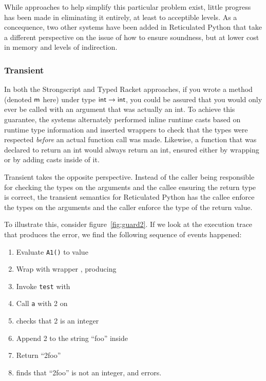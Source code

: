 \documentclass[a4paper,USenglish]{tex/lipics-v2016}
\begin{document}
While approaches to help simplify this particular problem exist, little
progress has been made in eliminating it entirely, at least to acceptible
levels. As a concequence, two other systems have been added in Reticulated
Python that take a different perspective on the issue of how to ensure
soundness, but at lower cost in memory and levels of indirection.

\subsubsection{Transient}

In both the Strongscript and Typed Racket approaches, if you wrote a method
(denoted ${\sf{m}}$ here) under type ${\sf{int}} \rightarrow {\sf{int}}$, you could be
assured that you would only ever be called with an argument that was
actually an int. To achieve this guarantee, the systems alternately
performed inline runtime casts based on runtime type information and
inserted wrappers to check that the types were respected \emph{before} an
actual function call was made. Likewise, a function that was declared to
return an int would always return an int, ensured either by wrapping or by
adding casts inside of it.

Transient takes the opposite perspective. Instead of the caller being
responsible for checking the types on the arguments and the callee ensuring
the return type is correct, the transient semantics for Reticulated Python
has the callee enforce the types on the arguments and the caller enforce the
type of the return value.

To illustrate this, consider figure~\ref{fig:guard2}. If we look at the
execution trace that produces the error, we find the following sequence of
events happened:
\begin{enumerate}
\item Evaluate \verb|A1()| to value 
\item Wrap  with wrapper , producing 
\item Invoke \verb|test| with 
\item Call \verb|a| with 2 on 
\item {} checks that 2 is an integer
\item Append 2 to the string ``foo'' inside 
\item Return ``2foo'' 
\item {} finds that ``2foo'' is not an integer, and errors.
\end{enumerate}
\end{document}
